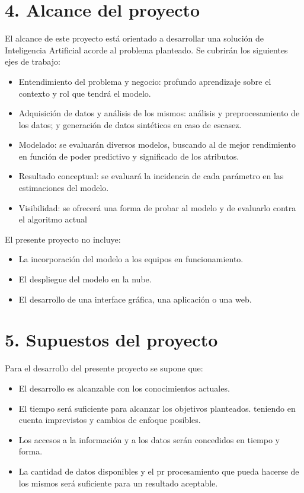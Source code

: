 \documentclass[
11pt, %
]{charter}
\begin{document}
\section{4. Alcance del proyecto}
\label{sec:alcance}

El alcance de este proyecto está orientado a desarrollar una solución de Inteligencia Artificial acorde al problema planteado. Se cubrirán los siguientes ejes de trabajo:

\begin{itemize}
	\item Entendimiento del problema y negocio: profundo aprendizaje sobre el contexto y rol que tendrá el modelo.
	\item Adquisición de datos y análisis de los mismos: análisis y preprocesamiento de los datos; y generación de datos sintéticos en caso de escasez.
	\item Modelado: se evaluarán diversos modelos, buscando al de mejor rendimiento en función de poder predictivo y significado de los atributos.
	\item Resultado conceptual: se evaluará la incidencia de cada parámetro en las estimaciones del modelo.
	\item Visibilidad: se ofrecerá una forma de probar al modelo y de evaluarlo contra el algoritmo actual	
\end{itemize}

El presente proyecto no incluye: 
\begin{itemize}
	\item La incorporación del modelo a los equipos en funcionamiento.
	\item El despliegue del modelo en la nube.
	\item El desarrollo de una interface gráfica, una aplicación o una web.
\end{itemize}



\section{5. Supuestos del proyecto}
\label{sec:supuestos}

Para el desarrollo del presente proyecto se supone que: 

\begin{itemize}
	\item El desarrollo es alcanzable con los conocimientos actuales.
	\item El tiempo será suficiente para alcanzar los objetivos planteados. teniendo en cuenta imprevistos y cambios de enfoque posibles.
	\item Los accesos a la información y a los datos serán concedidos en tiempo y forma.
	\item La cantidad de datos disponibles y el pr procesamiento que pueda hacerse de los mismos será suficiente para un resultado aceptable.
\end{itemize}
\end{document}

